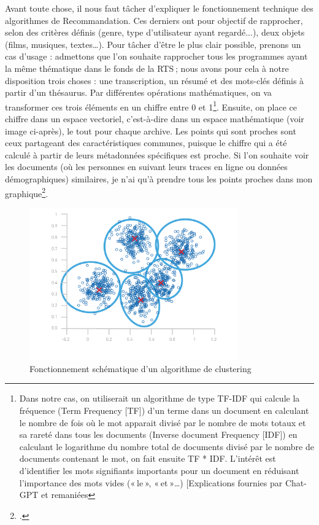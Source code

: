 Avant toute chose, il nous faut tâcher d’expliquer le fonctionnement technique des algorithmes de Recommandation. Ces derniers ont pour objectif de rapprocher, selon des critères définis (genre, type d'utilisateur ayant regardé...), deux objets (films, musiques, textes…). Pour tâcher d’être le plus clair possible, prenons un cas d’usage : admettons que l'on souhaite rapprocher tous les programmes ayant la même thématique dans le fonds de la RTS ; nous avons pour cela à notre disposition trois choses : une transcription, un résumé et des mots-clés définis à partir d’un thésaurus. Par différentes opérations mathématiques, on va transformer ces trois éléments en un chiffre entre 0 et 1\footnote{  Dans notre cas, on utiliserait un algorithme de type TF-IDF qui calcule la fréquence (Term Frequency [TF]) d’un terme dans un document en calculant le nombre de fois où le mot apparait divisé par le nombre de mots totaux et sa rareté dans tous les documents (Inverse document Frequency [IDF]) en calculant le logarithme du nombre total de documents divisé par le nombre de documents contenant le mot, on fait ensuite TF * IDF. L’intérêt est d’identifier les mots signifiants importants pour un document en réduisant l’importance des mots vides (« le », « et »…) [Explications fournies par Chat-GPT et remaniées}. Ensuite, on place ce chiffre dans un espace vectoriel, c’est-à-dire dans un espace mathématique (voir image ci-après), le tout pour chaque archive. Les points qui sont proches sont ceux partageant des caractéristiques communes, puisque le chiffre qui a été calculé à partir de leurs métadonnées spécifiques est proche. Si l'on souhaite voir les documents (où les personnes en suivant leurs traces en ligne ou données démographiques) similaires, je n’ai qu’à prendre tous les points proches dans mon graphique\footcite{zotero-216}.


\begin{figure}[h!]
	\centering
	\includegraphics[width=0.8\textwidth]{images/image10.png}
	\caption{Fonctionnement schématique d'un algorithme de clustering}
	\label{fig:image10}
\end{figure}

